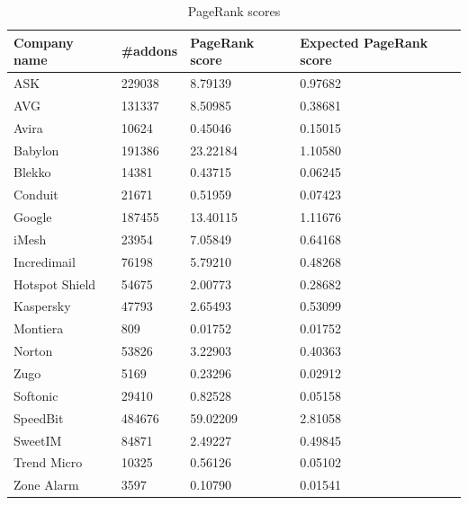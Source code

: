 \documentclass[11pt,oneside]{book}
\begin{document}

\begin{table}[h]
\centering
\caption{PageRank scores}
\label{table:pagerank_scores}
\begin{tabular}{@{}llll@{}}
\toprule
Company name   & \#addons & PageRank score & Expected PageRank score \\ \midrule
ASK            & 229038   & 8.79139              & 0.97682                \\
AVG            & 131337   & 8.50985              & 0.38681                \\
Avira          & 10624    & 0.45046              & 0.15015                \\
Babylon        & 191386   & 23.22184             & 1.10580                \\
Blekko         & 14381    & 0.43715              & 0.06245                \\
Conduit        & 21671    & 0.51959              & 0.07423                \\
Google         & 187455   & 13.40115             & 1.11676                \\
iMesh          & 23954    & 7.05849              & 0.64168                \\
Incredimail    & 76198    & 5.79210              & 0.48268                \\
Hotspot Shield & 54675    & 2.00773              & 0.28682                \\
Kaspersky      & 47793    & 2.65493              & 0.53099                \\
Montiera       & 809      & 0.01752              & 0.01752                \\
Norton         & 53826    & 3.22903              & 0.40363                \\
Zugo           & 5169     & 0.23296              & 0.02912                \\
Softonic       & 29410    & 0.82528              & 0.05158                \\
SpeedBit       & 484676   & 59.02209             & 2.81058                \\
SweetIM        & 84871    & 2.49227              & 0.49845                \\
Trend Micro    & 10325    & 0.56126              & 0.05102                \\
Zone Alarm     & 3597     & 0.10790              & 0.01541                \\ \bottomrule
\end{tabular}
\end{table}  
\end{document}
